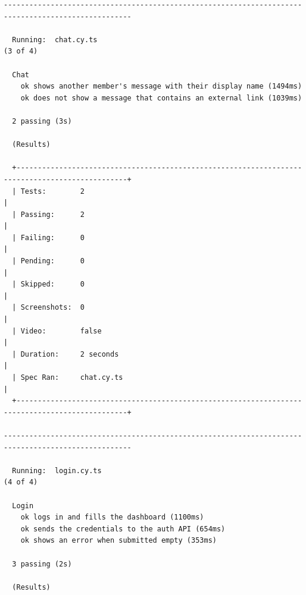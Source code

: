 \documentclass[10pt,a4paper]{article}
\begin{document}
\begin{Verbatim}[fontsize=\scriptsize,breaklines,frame=single]
----------------------------------------------------------------------------------------------------

  Running:  chat.cy.ts                                                                      (3 of 4)

  Chat
    ok shows another member's message with their display name (1494ms)
    ok does not show a message that contains an external link (1039ms)

  2 passing (3s)

  (Results)

  +------------------------------------------------------------------------------------------------+
  | Tests:        2                                                                                |
  | Passing:      2                                                                                |
  | Failing:      0                                                                                |
  | Pending:      0                                                                                |
  | Skipped:      0                                                                                |
  | Screenshots:  0                                                                                |
  | Video:        false                                                                            |
  | Duration:     2 seconds                                                                        |
  | Spec Ran:     chat.cy.ts                                                                       |
  +------------------------------------------------------------------------------------------------+

----------------------------------------------------------------------------------------------------

  Running:  login.cy.ts                                                                     (4 of 4)

  Login
    ok logs in and fills the dashboard (1100ms)
    ok sends the credentials to the auth API (654ms)
    ok shows an error when submitted empty (353ms)

  3 passing (2s)

  (Results)


\end{Verbatim}
\end{document}
